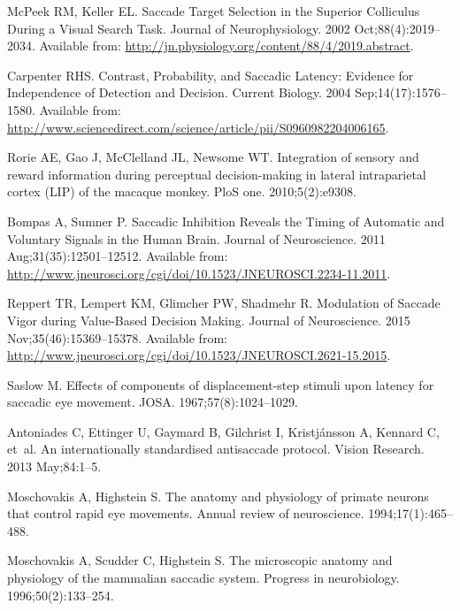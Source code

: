 \documentclass[10pt,letterpaper]{article}
\begin{document}
\begin{thebibliography}{10}
McPeek RM, Keller EL.
\newblock Saccade {Target} {Selection} in the {Superior} {Colliculus} {During}
  a {Visual} {Search} {Task}.
\newblock Journal of Neurophysiology. 2002 Oct;88(4):2019--2034.
\newblock Available from:
  \url{http://jn.physiology.org/content/88/4/2019.abstract}.

Carpenter RHS.
\newblock Contrast, {Probability}, and {Saccadic} {Latency}: {Evidence} for
  {Independence} of {Detection} and {Decision}.
\newblock Current Biology. 2004 Sep;14(17):1576--1580.
\newblock Available from:
  \url{http://www.sciencedirect.com/science/article/pii/S0960982204006165}.

Rorie AE, Gao J, McClelland JL, Newsome WT.
\newblock Integration of sensory and reward information during perceptual
  decision-making in lateral intraparietal cortex ({LIP}) of the macaque
  monkey.
\newblock PloS one. 2010;5(2):e9308.

Bompas A, Sumner P.
\newblock Saccadic {Inhibition} {Reveals} the {Timing} of {Automatic} and
  {Voluntary} {Signals} in the {Human} {Brain}.
\newblock Journal of Neuroscience. 2011 Aug;31(35):12501--12512.
\newblock Available from:
  \url{http://www.jneurosci.org/cgi/doi/10.1523/JNEUROSCI.2234-11.2011}.

Reppert TR, Lempert KM, Glimcher PW, Shadmehr R.
\newblock Modulation of {Saccade} {Vigor} during {Value}-{Based} {Decision}
  {Making}.
\newblock Journal of Neuroscience. 2015 Nov;35(46):15369--15378.
\newblock Available from:
  \url{http://www.jneurosci.org/cgi/doi/10.1523/JNEUROSCI.2621-15.2015}.

Saslow M.
\newblock Effects of components of displacement-step stimuli upon latency for
  saccadic eye movement.
\newblock JOSA. 1967;57(8):1024--1029.

Antoniades C, Ettinger U, Gaymard B, Gilchrist I, Kristjánsson A, Kennard C,
  et~al.
\newblock An internationally standardised antisaccade protocol.
\newblock Vision Research. 2013 May;84:1--5.

Moschovakis A, Highstein S.
\newblock The anatomy and physiology of primate neurons that control rapid eye
  movements.
\newblock Annual review of neuroscience. 1994;17(1):465--488.

Moschovakis A, Scudder C, Highstein S.
\newblock The microscopic anatomy and physiology of the mammalian saccadic
  system.
\newblock Progress in neurobiology. 1996;50(2):133--254.


\end{thebibliography}
\end{document}
